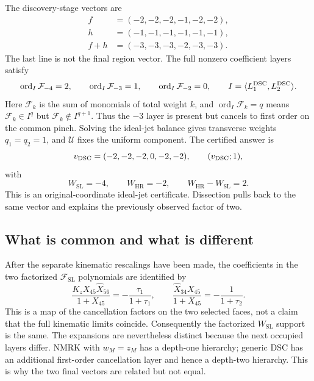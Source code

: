 \documentclass[11pt]{article}
\newcommand{\F}{\mathcal F}
\newcommand{\U}{\mathcal U}
\newcommand{\SL}{\mathrm{SL}}
\newcommand{\HR}{\mathrm{HR}}
\newcommand{\hX}{\widehat X}
\begin{document}
The discovery-stage vectors are
\begin{align}
 f&=(-2,-2,-2,-1,-2,-2),\nonumber\\
 h&=(-1,-1,-1,-1,-1,-1),\nonumber\\
 f+h&=(-3,-3,-3,-2,-3,-3).
 \label{eq:dsc-naive}
\end{align}
The last line is not the final region vector.  The full nonzero coefficient
layers satisfy
\begin{equation}
 \operatorname{ord}_I\F_{-4}=2,\qquad
 \operatorname{ord}_I\F_{-3}=1,\qquad
 \operatorname{ord}_I\F_{-2}=0,\qquad
 I=\langle L_1^{\rm DSC},L_2^{\rm DSC}\rangle.
\label{eq:dsc-ideal-orders}
\end{equation}
Here \(\F_k\) is the sum of monomials of total weight \(k\), and
\(\operatorname{ord}_I\F_k=q\) means
\(\F_k\in I^q\) but \(\F_k\notin I^{q+1}\).
Thus the \(-3\) layer is present but cancels to first order on the common
pinch.  Solving the ideal-jet balance gives transverse weights
\(q_1=q_2=1\), and \(\U\) fixes the uniform component.  The certified answer is
\begin{equation}
 v_{\rm DSC}=(-2,-2,-2,0,-2,-2),\qquad (v_{\rm DSC};1),
 \label{eq:dsc-vector}
\end{equation}
with
\begin{equation}
 W_{\SL}=-4,\qquad W_{\HR}=-2,\qquad
 W_{\HR}-W_{\SL}=2.
 \label{eq:dsc-gap}
\end{equation}
This is an original-coordinate ideal-jet certificate.  Dissection pulls back
to the same vector and explains the previously observed factor of two.

\subsection{What is common and what is different}

After the separate kinematic rescalings have been made, the coefficients in
the two factorized \(\F_{\SL}\) polynomials are identified by
\begin{equation}
 \frac{K_zX_{45}\hX_{56}}{1+X_{45}}=-\frac{\tau_1}{1+\tau_1},
 \qquad
 \frac{\hX_{34}X_{45}}{1+X_{45}}=-\frac{1}{1+\tau_2}.
 \label{eq:factor-map}
\end{equation}
This is a map of the cancellation factors on the two selected faces, not a
claim that the full kinematic limits coincide.  Consequently the factorized
\(W_{\SL}\) support is the same.  The expansions are nevertheless distinct because the
next occupied layers differ.  NMRK with \(w_M=z_M\) has a depth-one hierarchy;
generic DSC has an additional first-order cancellation layer and hence a
depth-two hierarchy.  This is why the two final vectors are related but not
equal.
\end{document}
